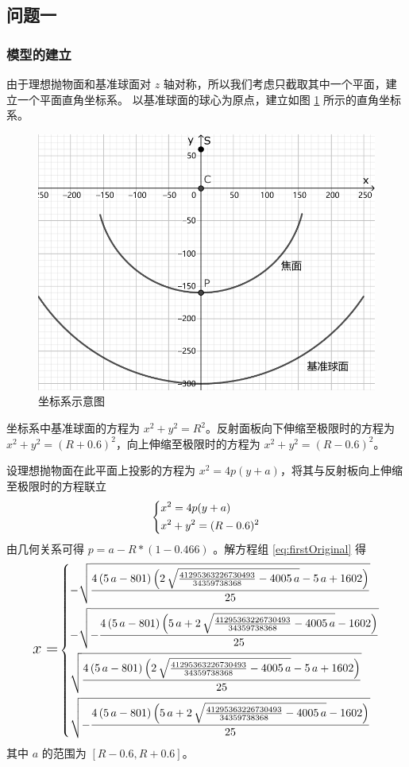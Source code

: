 \documentclass[withoutpreface,bwprint]{cumcmthesis} %
\begin{document}
\subsection{问题一}
\subsubsection{模型的建立}
由于理想抛物面和基准球面对 $z$ 轴对称，所以我们考虑只截取其中一个平面，建立一个平面直角坐标系。
以基准球面的球心为原点，建立如图 \ref{fig:coordinate1} 所示的直角坐标系。
\begin{figure}[!h]
    \centering
    \includegraphics[width=.45\textwidth]{CoordinateSystem1.pdf}
    \caption{坐标系示意图}
    \label{fig:coordinate1}
\end{figure}
坐标系中基准球面的方程为 $x^2 + y^2 = R^2$。反射面板向下伸缩至极限时的方程为
$x^2 + y^2 = (R + 0.6)^2$，向上伸缩至极限时的方程为 $x^2 + y^2 = (R - 0.6)^2$。

设理想抛物面在此平面上投影的方程为 $x^2 = 4p(y + a)$，将其与反射板向上伸缩至极限时的方程联立
\begin{equation}
    \label{eq:firstOriginal}
    \begin{dcases}
        x^2 = 4p(y + a) \\
        x^2 + y^2 = (R - 0.6)^2
    \end{dcases}
\end{equation}
由几何关系可得 $p = a - R * (1 - 0.466)$ 。解方程组 \ref{eq:firstOriginal} 得
\[
    \text{\Large $x =$}
    \begin{dcases}
        -\sqrt{\frac{4\,{\left(5\,a-801\right)}\,{\left(2\,\sqrt{\frac{41295363226730493}
        {34359738368}-4005\,a}-5\,a+1602\right)}}{25}}                    \\
        -\sqrt{-\frac{4\,{\left(5\,a-801\right)}\,{\left(5\,a+2\,\sqrt{
        \frac{41295363226730493}{34359738368}-4005\,a}-1602\right)}}{25}} \\
        \sqrt{\frac{4\,{\left(5\,a-801\right)}\,{\left(2\,\sqrt{\frac{41295363226730493}
        {34359738368}-4005\,a}-5\,a+1602\right)}}{25}}                    \\
        \sqrt{-\frac{4\,{\left(5\,a-801\right)}\,{\left(5\,a+2\,\sqrt{
                            \frac{41295363226730493}{34359738368}-4005\,a}-1602\right)}}{25}}
    \end{dcases}
\]
其中 $a$ 的范围为 $\left[R - 0.6, R + 0.6\right]$。
\end{document}
